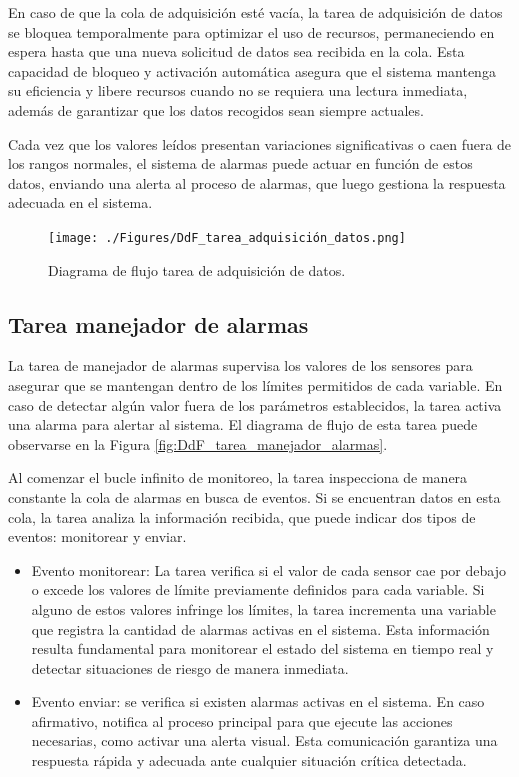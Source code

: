En caso de que la cola de adquisición esté vacía, la tarea de adquisición de datos se bloquea temporalmente para optimizar el uso de recursos, permaneciendo en espera hasta que una nueva solicitud de datos sea recibida en la cola. Esta capacidad de bloqueo y activación automática asegura que el sistema mantenga su eficiencia y libere recursos cuando no se requiera una lectura inmediata, además de garantizar que los datos recogidos sean siempre actuales.

Cada vez que los valores leídos presentan variaciones significativas o caen fuera de los rangos normales, el sistema de alarmas puede actuar en función de estos datos, enviando una alerta al proceso de alarmas, que luego gestiona la respuesta adecuada en el sistema.

\vspace{1cm}
\begin{figure}[htbp]
	\centering
	\texttt{[image: ./Figures/DdF\_tarea\_adquisición\_datos.png]}
	\caption{Diagrama de flujo tarea de adquisición de datos.}
	\label{fig:DdF_tarea_adquisición_datos}
\end{figure}
\vspace{1cm}

\subsection{Tarea manejador de alarmas}

La tarea de manejador de alarmas supervisa los valores de los sensores para asegurar que se mantengan dentro de los límites permitidos de cada variable. En caso de detectar algún valor fuera de los parámetros establecidos, la tarea activa una alarma para alertar al sistema. El diagrama de flujo de esta tarea puede observarse en la Figura \ref{fig:DdF_tarea_manejador_alarmas}.

Al comenzar el bucle infinito de monitoreo, la tarea inspecciona de manera constante la cola de alarmas en busca de eventos. Si se encuentran datos en esta cola, la tarea analiza la información recibida, que puede indicar dos tipos de eventos: monitorear y enviar.

\begin{itemize}
\item Evento monitorear: La tarea verifica si el valor de cada sensor cae por debajo o excede los valores de límite previamente definidos para cada variable. Si alguno de estos valores infringe los límites, la tarea incrementa una variable que registra la cantidad de alarmas activas en el sistema. Esta información resulta fundamental para monitorear el estado del sistema en tiempo real y detectar situaciones de riesgo de manera inmediata.
\item Evento enviar: se verifica si existen alarmas activas en el sistema. En caso afirmativo, notifica al proceso principal para que ejecute las acciones necesarias, como activar una alerta visual. Esta comunicación garantiza una respuesta rápida y adecuada ante cualquier situación crítica detectada.
\end{itemize}

